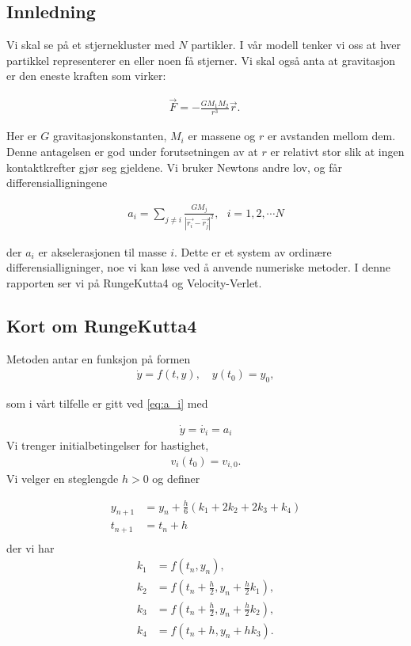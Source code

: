 \documentclass[11pt]{article}
\begin{document}
\begin{multicols}{2}



\section{Innledning}
Vi skal se på et stjernekluster med $N$ partikler. I vår modell tenker
vi oss at hver partikkel representerer en eller noen få stjerner. Vi
skal også anta at gravitasjon er den eneste kraften som virker:

\begin{align}
 \vec F = -\frac{GM_1M_2}{r^3}\vec r.\
\end{align}

Her er $G$ gravitasjonskonstanten, $M_i$ er massene og $r$ er avstanden mellom dem. 
Denne antagelsen er god under forutsetningen av at $r$ er relativt
stor slik at  ingen kontaktkrefter gjør seg gjeldene. Vi bruker
Newtons andre lov, og får differensialligningene 

\begin{align} \label{eq:a_i}
a_i = \sum_{j \neq i} \frac{GM_j}{{|\vec{r_i} - \vec{r_j}|}^2} , \ \ \
  i = 1,2, \cdots N 
\end{align}

der $a_i$ er akselerasjonen til masse $i$. Dette er et system av
ordinære differensialligninger, noe vi kan løse ved å anvende
numeriske metoder. I denne rapporten ser vi på RungeKutta4 og Velocity-Verlet.

\subsection{Kort om RungeKutta4~\small{\cite{RK4}}}
Metoden antar en funksjon på formen 
\begin{align*}
\dot{y} = f(t, y), \quad y(t_0) = y_0,
\end{align*}

som i vårt tilfelle er gitt ved \eqref{eq:a_i} med 

\begin{align*}
\dot y = \dot{v_i} = a_i 
\end{align*}
Vi trenger initialbetingelser for hastighet,
\begin{align*}
 v_i(t_0) = v_{i,0}.
\end{align*}
Vi velger en steglengde $h>0$ og definer 

\begin{align*}
y_{n+1} &= y_n + \tfrac{h}{6}\left(k_1 + 2k_2 + 2k_3 + k_4 \right)\\
t_{n+1} &= t_n + h \\
\end{align*}
der vi har
\begin{align*}
k_1 &= f(t_n, y_n), \\
k_2 &= f(t_n + \tfrac{h}{2}, y_n + \tfrac{h}{2} k_1), \\
k_3 &= f(t_n + \tfrac{h}{2}, y_n + \tfrac{h}{2} k_2), \\
k_4 &= f(t_n + h, y_n + hk_3).
\end{align*}


\end{multicols}
\end{document}
